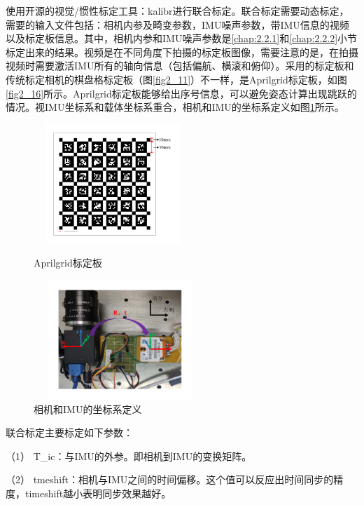 使用开源的视觉/惯性标定工具：kalibr进行联合标定。联合标定需要动态标定，需要的输入文件包括：相机内参及畸变参数，IMU噪声参数，带IMU信息的视频以及标定板信息。其中，相机内参和IMU噪声参数是\ref{chap:2.2.1}和\ref{chap:2.2.2}小节标定出来的结果。视频是在不同角度下拍摄的标定板图像，需要注意的是，在拍摄视频时需要激活IMU所有的轴向信息（包括偏航、横滚和俯仰）。采用的标定板和传统标定相机的棋盘格标定板（图\ref{fig2_11}）不一样，是Aprilgrid标定板，如图\ref{fig2_16}所示。Aprilgrid标定板能够给出序号信息，可以避免姿态计算出现跳跃的情况。视IMU坐标系和载体坐标系重合，相机和IMU的坐标系定义如图\ref{fig2_17}所示。
\begin{figure}[h]\setlength{\belowcaptionskip}{-12pt}
	\centering	
	\begin{minipage}[t]{0.35\linewidth}				
		\includegraphics[height=4.5cm,width=6cm]{figures/chapter2/fig2_16}		
		\caption{Aprilgrid标定板}	\label{fig2_16}	
	\end{minipage}%
	\hspace{0.1in}	
	\begin{minipage}[t]{0.5\linewidth}		
		\centering		
		\includegraphics[height=4.5cm,width=6.5cm]{figures/chapter2/fig2_17}		
		\caption{相机和IMU的坐标系定义} \label{fig2_17}		
	\end{minipage}	
\end{figure} 

联合标定主要标定如下参数：

（1）  T\_ic：与IMU的外参。即相机到IMU的变换矩阵。

（2）  tmeshift：相机与IMU之间的时间偏移。这个值可以反应出时间同步的精度，timeshift越小表明同步效果越好。

